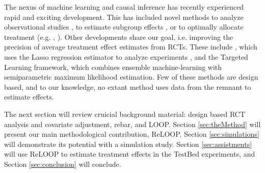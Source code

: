 The nexus of machine learning and causal inference has recently experienced
rapid and exciting development.
This has included novel methods to analyze observational studies
\citep[e.g.][]{diamond2013genetic},
to estimate subgroup effects \citep[e.g.][]{bothways,kunzel2018transfer}, or to optimally
allocate treatment (e.g. \cite{uplift}, \cite{siyuan}).
Other developments share our goal, i.e. improving the precision of
average treatment effect estimates from RCTs.
These include \citet{bloniarz2016lasso}, which uses the Lasso regression
estimator \citep{tibshirani1996regression} to analyze experiments
\citep[also see][]{belloni2014inference}, and the Targeted Learning
\citep{van2011targeted} framework,
which combines ensemble machine-learning with semiparametric maximum
likelihood estimation.
Few of these methods are design based, and to our knowledge, no extant
method uses data from the remnant to estimate effects.

The next section will review cruicial background material: design
based RCT analysis and covariate adjustment, rebar, and LOOP.
Section \ref{sec:theMethod} will present our main methodological
contribution, ReLOOP.
Section \ref{sec:simulations} will demonstrate its potential with a
simulation study.
Section \ref{sec:assistments} will use ReLOOP to estimate treatment
effects in the TestBed experiments, and Section \ref{sec:conclusion}
will conclude.